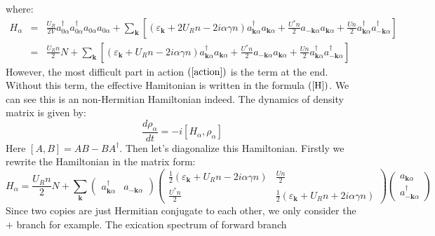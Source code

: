 \documentclass{article}
\newcommand{\tmmathbf}[1]{\ensuremath{\boldsymbol{#1}}}
\begin{document}
where:
\begin{eqnarray}
  H_{\alpha} & = & \frac{U_R}{2 V} a_{0 \alpha}^{\dagger} a_{0
  \alpha}^{\dagger} a_{0 \alpha} a_{0 \alpha} + \sum_{\tmmathbf{k}} \left[
  (\varepsilon_{\tmmathbf{k}} + 2 U_R n - 2 i \alpha \gamma n) a_{\tmmathbf{k}
  \alpha}^{\dagger} a_{\tmmathbf{k} \alpha} + \frac{U^{\ast} n}{2}
  a_{-\tmmathbf{k} \alpha} a_{\tmmathbf{k} \alpha} + \frac{U n}{2}
  a_{\tmmathbf{k} \alpha}^{\dagger} a_{-\tmmathbf{k} \alpha}^{\dagger} \right]
  \nonumber\\
  & = & \frac{U_R n}{2} N + \sum_{\tmmathbf{k}} \left[
  (\varepsilon_{\tmmathbf{k}} + U_R n - 2 i \alpha \gamma n) a_{\tmmathbf{k}
  \alpha}^{\dagger} a_{\tmmathbf{k} \alpha} + \frac{U^{\ast} n}{2}
  a_{-\tmmathbf{k} \alpha} a_{\tmmathbf{k} \alpha} + \frac{U n}{2}
  a_{\tmmathbf{k} \alpha}^{\dagger} a_{-\tmmathbf{k} \alpha}^{\dagger} \right]
  \label{H} 
\end{eqnarray}
However, the most difficult part in action $\left( \ref{action} \right)$ is
the term at the end. Without this term, the effective Hamitonian is written in
the formula $\left( \ref{H} \right)$. We can see this is an non-Hermitian
Hamiltonian indeed. The dynamics of density matrix is given by:
\begin{equation}
  \frac{d \rho_{\alpha}}{d t} = - i [H_{\alpha}, \rho_{\alpha}]
\end{equation}
Here $[A, B] = A B - B A^{\dagger}$. Then let's diagonalize this Hamiltonian.
Firstly we rewrite the Hamiltonian in the matrix form:
\begin{equation}
  H_{\alpha} = \frac{U_R n}{2} N + \sum_{\tmmathbf{k}} \left(\begin{array}{cc}
    a_{\tmmathbf{k} \alpha}^{\dagger} & a_{-\tmmathbf{k} \alpha}
  \end{array}\right) \left(\begin{array}{cc}
    \frac{1}{2} (\varepsilon_{\tmmathbf{k}} + U_R n - 2 i \alpha \gamma n) &
    \frac{U n}{2}\\
    \frac{U^{\ast} n}{2} & \frac{1}{2} (\varepsilon_{\tmmathbf{k}} + U_R n + 2
    i \alpha \gamma n)
  \end{array}\right) \left(\begin{array}{c}
    a_{\tmmathbf{k} \alpha}\\
    a_{-\tmmathbf{k} \alpha}^{\dagger}
  \end{array}\right)
\end{equation}
Since two copies are just Hermitian conjugate to each other, we only consider
the $+$ branch for example. The exication spectrum of forward branch
\end{document}
